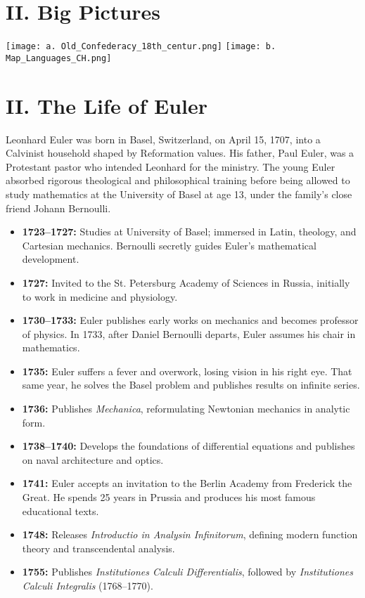 \documentclass[9pt]{article}
\begin{document}
\section*{II. Big Pictures}

\vspace{1em}

\begin{center}
    \texttt{[image: a. Old\_Confederacy\_18th\_centur.png]}
    \vspace{1em}
    \texttt{[image: b. Map\_Languages\_CH.png]}
\end{center}

\newpage

\section*{II. The Life of Euler}
Leonhard Euler was born in Basel, Switzerland, on April 15, 1707, into a Calvinist household shaped by Reformation values. His father, Paul Euler, was a Protestant pastor who intended Leonhard for the ministry. The young Euler absorbed rigorous theological and philosophical training before being allowed to study mathematics at the University of Basel at age 13, under the family’s close friend Johann Bernoulli.

\begin{itemize}
  \item \textbf{1723–1727:} Studies at University of Basel; immersed in Latin, theology, and Cartesian mechanics. Bernoulli secretly guides Euler’s mathematical development.
  \item \textbf{1727:} Invited to the St. Petersburg Academy of Sciences in Russia, initially to work in medicine and physiology.
  \item \textbf{1730–1733:} Euler publishes early works on mechanics and becomes professor of physics. In 1733, after Daniel Bernoulli departs, Euler assumes his chair in mathematics.
  \item \textbf{1735:} Euler suffers a fever and overwork, losing vision in his right eye. That same year, he solves the Basel problem and publishes results on infinite series.
  \item \textbf{1736:} Publishes \textit{Mechanica}, reformulating Newtonian mechanics in analytic form.
  \item \textbf{1738–1740:} Develops the foundations of differential equations and publishes on naval architecture and optics.
  \item \textbf{1741:} Euler accepts an invitation to the Berlin Academy from Frederick the Great. He spends 25 years in Prussia and produces his most famous educational texts.
  \item \textbf{1748:} Releases \textit{Introductio in Analysin Infinitorum}, defining modern function theory and transcendental analysis.
  \item \textbf{1755:} Publishes \textit{Institutiones Calculi Differentialis}, followed by \textit{Institutiones Calculi Integralis} (1768–1770).
\end{itemize}
\end{document}
